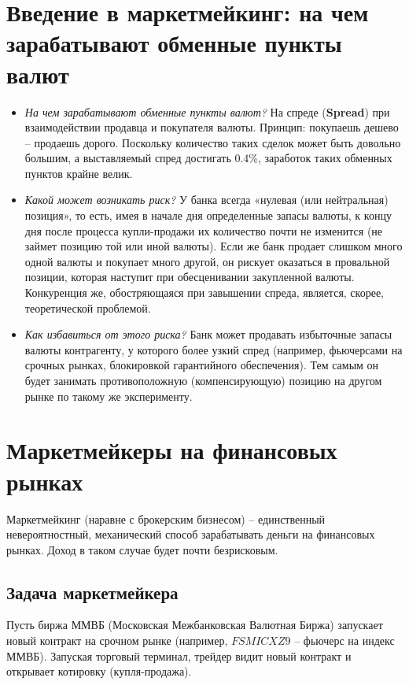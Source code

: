 \documentclass{article}
\begin{document}
\section{Введение в маркетмейкинг: на чем зарабатывают обменные пункты валют}
\begin{itemize}
\item \emph{На чем зарабатывают обменные пункты валют?} На спреде (\textbf{Spread}) при взаимодействии продавца и покупателя валюты. Принцип: покупаешь дешево – продаешь дорого. Поскольку количество таких сделок может быть довольно большим, а выставляемый спред достигать 0.4\%, заработок таких обменных пунктов крайне велик. 

\item \emph{Какой может возникать риск?} У банка всегда «нулевая (или нейтральная) позиция», то есть, имея в начале дня определенные запасы валюты, к концу дня после процесса купли-продажи их количество почти не изменится (не займет позицию той или иной валюты). Если же банк продает слишком много одной валюты и покупает много другой, он рискует оказаться в провальной позиции, которая наступит при обесценивании закупленной валюты. Конкуренция же, обостряющаяся при завышении спреда, является, скорее, теоретической проблемой.

\item \emph{Как избавиться от этого риска?} Банк может продавать избыточные запасы валюты контрагенту, у которого более узкий спред (например, фьючерсами на срочных рынках, блокировкой гарантийного обеспечения). Тем самым он будет занимать противоположную (компенсирующую) позицию на другом рынке по такому же эксперименту.  
\end{itemize}

\section{Маркетмейкеры на финансовых рынках}

Маркетмейкинг (наравне с брокерским бизнесом) – единственный невероятностный, механический способ зарабатывать деньги на финансовых рынках. Доход в таком случае будет почти безрисковым. 

\subsection{Задача маркетмейкера}

Пусть биржа ММВБ (Московская Межбанковская Валютная Биржа) запускает новый контракт на срочном рынке (например, $ FSMICXZ9 $ – фьючерс на индекс ММВБ). Запуская торговый терминал, трейдер видит новый контракт и открывает котировку (купля-продажа). 
\end{document}
